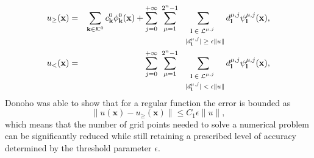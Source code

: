 \begin{eqnarray}
u_{\ge}({\mathbf x}) &=& \sum_{{\mathbf k} \in {\mathcal{K}}^0} c_{\mathbf
k}^{0} \phi_{\mathbf k}^{0}({\mathbf x}) + \sum_{j=0}^{+\infty} \
\sum_{\mu=1}^{2^{n}-1}\ \sum_{
{ \vspace{-10pt}
        \stackrel{ \mbox{\hspace{5pt}\scriptsize
         ${    {\mathbf l} \in {\mathcal{L}}^{\mu, j}}$ \hspace{5pt}} }{
         \mbox{ \rule[0pt]{0pt}{10pt}\scriptsize%
         $| d^{\mu, j}_{\mathbf l} | \ge \epsilon \|u \|$} }    
}}
d_{\mathbf l}^{\mu, j} \psi_{\mathbf l}^{\mu, j}({\mathbf x}) ,
\label{eq:u_ge} \\
u_{<}({\mathbf x}) &=& \sum_{j=0}^{+\infty} \
\sum_{\mu=1}^{2^{n}-1}\ \sum_{
{ \vspace{-10pt}
        \stackrel{ \mbox{\hspace{5pt}\scriptsize
         ${    {\mathbf l} \in {\mathcal{L}}^{\mu, j}}$ \hspace{5pt}} }{
         \mbox{ \rule[0pt]{0pt}{10pt}\scriptsize%
         $| d^{\mu, j}_{\mathbf l} | < \epsilon \|u \|$} }    
}}
d_{\mathbf l}^{\mu, j} \psi_{\mathbf l}^{\mu, j}({\mathbf x}) ,
\label{eq:u_lt}
\end{eqnarray}
%
Donoho \cite{donoho:1992} was able to show that for a regular
function the error is bounded as
%
\begin{equation}
\| u({\mathbf x})-u_{\ge}({\mathbf x}) \|  \le C_1 \epsilon \|u \|
\label{eq:conv_eps},
\end{equation}
%
which means that the number of grid points needed to solve a numerical problem can be significantly reduced while still retaining a prescribed level of accuracy determined by the threshold parameter $\epsilon$.

